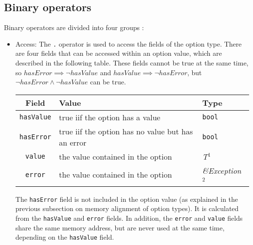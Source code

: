 \subsection{Binary operators}

Binary operators are divided into four groups :
\begin{itemize}
\item Access: The \texttt{.} operator is used to access the fields of the option
  type. There are four fields that can be accessed within an option value, which
  are described in the following table. These fields cannot be true at the same
  time, so $hasError \implies \lnot hasValue$ and $hasValue \implies \lnot
  hasError$, but $\lnot hasError \land \lnot hasValue$ can be true.

  \begin{center}\begin{adjustbox}{max width=1.0\linewidth}
      \begin{threeparttable}
        \begin{tabular}{|c|ll|}
          \hline
          Field & Value & Type \\
          \hline
          \hline
          \texttt{hasValue} & true iif the option has a value & \texttt{bool} \\
          \texttt{hasError} & true iif the option has no value but has an error & \texttt{bool} \\
          \Xhline{0.001pt}
          \texttt{value} & the value contained in the option & \textit{T}$^{1^{\phantom{j}}}$ \\
          \texttt{error} & the value contained in the option & \textit{\&Exception}$^{2^{\phantom{j}}}$ \\
          \hline
        \end{tabular}
      \end{threeparttable}
  \end{adjustbox}\end{center}

  The \texttt{hasError} field is not included in the option value (as explained
  in the previous subsection on memory alignment of option types). It is
  calculated from the \texttt{hasValue} and \texttt{error} fields. In addition, the
  \texttt{error} and \texttt{value} fields share the same memory address, but
  are never used at the same time, depending on the \texttt{hasValue} field.


\end{itemize}
